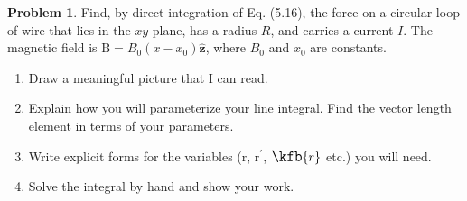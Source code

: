 \documentclass[10pt]{article}
\theoremstyle{definition}
\newtheorem{problem}{Problem}
\newcommand{\uz}{\hat{\mathbf{z}}}
\newcommand{\pr}[1]{{#1^\prime}}
\newcommand{\bscriptr}{\fontsize{12pt}{12pt}\kfb{r}}
\newcommand{\bv}[1]{\bm{\mathrm{#1}}}
\begin{document}
\begin{problem}
Find, by direct integration of Eq. (5.16), the force on a circular loop of wire that lies in the $xy$ plane, has a
radius $R$, and carries a current $I$. The magnetic field is $\bv{B} = B_0(x-x_0)\uz$, where $B_0$ and $x_0$ are constants.
\begin{enumerate}[label=(\alph*)]
  \item Draw a meaningful picture that I can read.
  \item Explain how you will parameterize your line integral. Find the vector length element in terms of your
        parameters.
  \item Write explicit forms for the variables ($\bv{r}$, $\pr{\bv{r}}$, $\bscriptr$ etc.) you will need.
  \item Solve the integral by hand and show your work.
\end{enumerate}
\end{problem}
\end{document}
